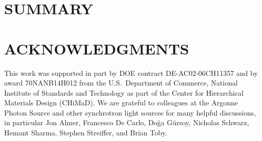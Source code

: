 \documentclass{aip-cp}
\newcommand\ryan[1]{}
\newcommand\ryan[1]{{\color{green}[Ryan: #1]}}
\begin{document}

\section{SUMMARY}









\section{ACKNOWLEDGMENTS}

This work was supported in part by DOE contract DE-AC02-06CH11357 and by award 70NANB14H012 from the U.S.\  Department of Commerce, National Institute of Standards and Technology as part of the Center for Hierarchical Materials Design (CHiMaD).
We are grateful to colleagues at the Argonne Photon Source and other synchrotron light sources
for many helpful discussions, in particular Jon Almer, Francesco De Carlo, Do{\u{g}}a G{\"u}rsoy, Nicholas Schwarz, Hemant Sharma, Stephen Streiffer, and Brian Toby.


\nocite{*}
%
%
\end{document}

